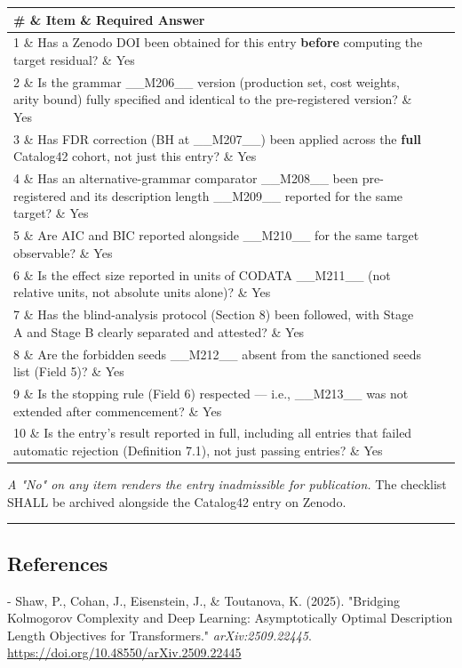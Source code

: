 \begin{tabular}{|l|l|l|}
\hline
\# \& Item \& Required Answer \\
\hline
1 \& Has a Zenodo DOI been obtained for this entry \textbf{before} computing the target residual? \& Yes \\
2 \& Is the grammar \_\_M206\_\_ version (production set, cost weights, arity bound) fully specified and identical to the pre-registered version? \& Yes \\
3 \& Has FDR correction (BH at \_\_M207\_\_) been applied across the \textbf{full} Catalog42 cohort, not just this entry? \& Yes \\
4 \& Has an alternative-grammar comparator \_\_M208\_\_ been pre-registered and its description length \_\_M209\_\_ reported for the same target? \& Yes \\
5 \& Are AIC and BIC reported alongside \_\_M210\_\_ for the same target observable? \& Yes \\
6 \& Is the effect size reported in units of CODATA \_\_M211\_\_ (not relative units, not absolute units alone)? \& Yes \\
7 \& Has the blind-analysis protocol (Section 8) been followed, with Stage A and Stage B clearly separated and attested? \& Yes \\
8 \& Are the forbidden seeds \_\_M212\_\_ absent from the sanctioned seeds list (Field 5)? \& Yes \\
9 \& Is the stopping rule (Field 6) respected --- i.e., \_\_M213\_\_ was not extended after commencement? \& Yes \\
10 \& Is the entry's result reported in full, including all entries that failed automatic rejection (Definition 7.1), not just passing entries? \& Yes \\
\hline
\end{tabular}
\textit{A "No" on any item renders the entry inadmissible for publication.} The checklist SHALL be archived alongside the Catalog42 entry on Zenodo.

\noindent\rule{\textwidth}{0.4pt}

\subsection{References}

- Shaw, P., Cohan, J., Eisenstein, J., \& Toutanova, K. (2025). "Bridging Kolmogorov Complexity and Deep Learning: Asymptotically Optimal Description Length Objectives for Transformers." \textit{arXiv:2509.22445}. \href{https://doi.org/10.48550/arXiv.2509.22445}{https://doi.org/10.48550/arXiv.2509.22445}

